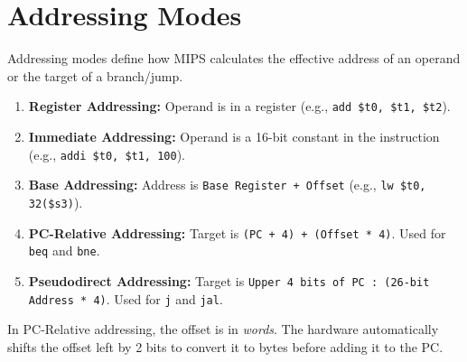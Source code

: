 \section{Addressing Modes}

Addressing modes define how MIPS calculates the effective address of an operand or the target of a branch/jump.

\begin{enumerate}
    \item \textbf{Register Addressing:} Operand is in a register (e.g., \texttt{add \$t0, \$t1, \$t2}).
    \item \textbf{Immediate Addressing:} Operand is a 16-bit constant in the instruction (e.g., \texttt{addi \$t0, \$t1, 100}).
    \item \textbf{Base Addressing:} Address is \texttt{Base Register + Offset} (e.g., \texttt{lw \$t0, 32(\$s3)}).
    \item \textbf{PC-Relative Addressing:} Target is \texttt{(PC + 4) + (Offset * 4)}. Used for \texttt{beq} and \texttt{bne}.
    \item \textbf{Pseudodirect Addressing:} Target is \texttt{Upper 4 bits of PC : (26-bit Address * 4)}. Used for \texttt{j} and \texttt{jal}.
\end{enumerate}

\begin{remark}
In PC-Relative addressing, the offset is in \textit{words}. The hardware automatically shifts the offset left by 2 bits to convert it to bytes before adding it to the PC.
\end{remark}
